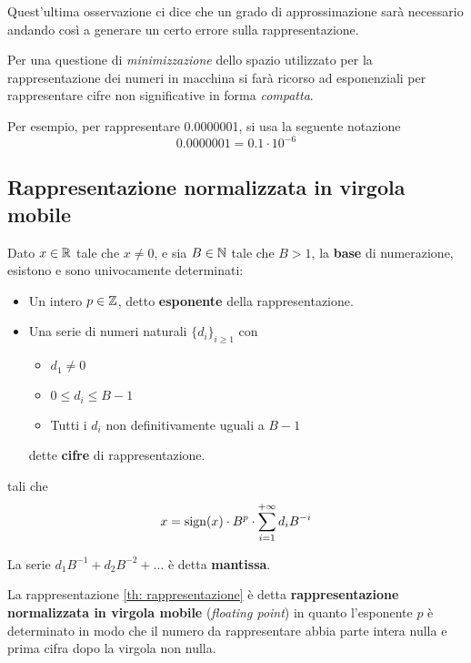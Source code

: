 Quest'ultima osservazione ci dice che un grado di approssimazione sarà necessario andando così a generare un
certo errore sulla rappresentazione.

Per una questione di \emph{minimizzazione} dello spazio utilizzato per la rappresentazione dei numeri in
macchina si farà ricorso ad esponenziali per rappresentare cifre non significative in forma \emph{compatta}.

\begin{example}
	Per esempio, per rappresentare 0.0000001, si usa la seguente notazione
	\[ 0.0000001 = 0.1 \cdot 10^{-6} \]
\end{example}

\subsection{Rappresentazione normalizzata in virgola mobile}
\begin{theorem}[Rappresentazione]\label{th: rappresentazione}
	Dato $x \in \mathbb{R}$ tale che $x \neq 0$, e sia $B \in \mathbb{N}$ tale che $B > 1$, la \textbf{base} di numerazione,
	esistono e sono univocamente determinati:
	\begin{itemize}
		\item Un intero $p \in \mathbb{Z}$, detto \textbf{esponente} della rappresentazione.
		\item Una serie di numeri naturali $\{ d_i \}_{i \geq 1}$ con
		      \begin{itemize}
			      \item $d_1 \neq 0$
			      \item $0 \leq d_i \leq B - 1$
			      \item Tutti i $d_i$ non definitivamente uguali a $B - 1$
		      \end{itemize}
		      dette \textbf{cifre} di rappresentazione.
	\end{itemize}
	tali che
	\[ x = \operatorname{sign}(x) \cdot B^p \cdot \sum_{i=1}^{+\infty} d_i B^{-i} \]
\end{theorem}

\begin{definition}
	La serie $d_1 B^{-1} + d_2 B^{-2} + \dots$ è detta \textbf{mantissa}.
\end{definition}

La rappresentazione \ref{th: rappresentazione} è detta \textbf{rappresentazione normalizzata in virgola mobile}
(\emph{floating point}) in quanto l'esponente $p$ è determinato in modo che il numero da rappresentare abbia
parte intera nulla e prima cifra dopo la virgola non nulla.

